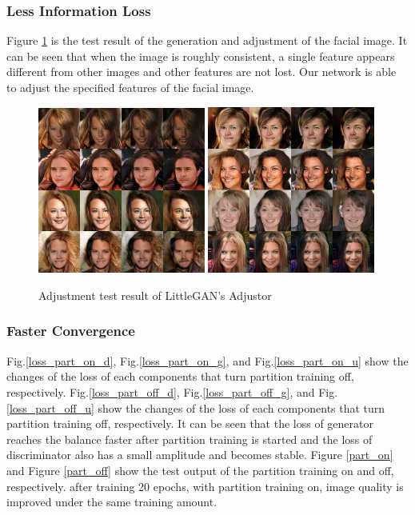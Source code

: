 \subsubsection*{Less Information Loss}
Figure \ref{adjust} is the test result of the generation and adjustment of the facial image.
It can be seen that when the image is roughly consistent, a single feature appears different from other images and other features are not lost.
Our network is able to adjust the specified features of the facial image.

\begin{figure}
    \begin{center}
    \includegraphics[width=0.49\textwidth]{figures/result_adjust_1.png}
    \includegraphics[width=0.49\textwidth]{figures/result_adjust_2.png}
    \caption{Adjustment test result of LittleGAN's Adjustor}
    \label{adjust}
    \end{center}
\end{figure}

\subsubsection*{Faster Convergence}
Fig.\ref{loss_part_on_d}, Fig.\ref{loss_part_on_g}, and Fig.\ref{loss_part_on_u} show the changes of the loss of each components that turn partition training off, respectively.
Fig.\ref{loss_part_off_d}, Fig.\ref{loss_part_off_g}, and Fig.\ref{loss_part_off_u} show the changes of the loss of each components that turn partition training off, respectively.
It can be seen that the loss of generator reaches the balance faster after partition training is started and the loss of discriminator also has a small amplitude and becomes stable.
Figure \ref{part_on} and Figure \ref{part_off} show the test output of the partition training on and off, respectively.
after training 20 epochs, with partition training on, image quality is improved under the same training amount.

